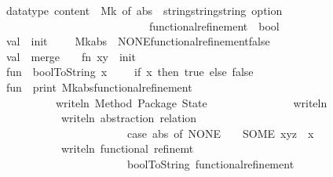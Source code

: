 \begin{isabellebody}
\isanewline
\ \ \ \ \ datatype\ content\ {\isacharequal}\ Mk\ of\ {\isacharbraceleft}abs\ {\isacharcolon}\ {\isacharparenleft}string{\isacharasterisk}string{\isacharasterisk}string{\isacharparenright}\ option{\isacharcomma}\isanewline
\ \ \ \ \ \ \ \ \ \ \ \ \ \ \ \ \ \ \ \ \ \ \ \ \ \ \ \ \ \ \ functional{\isacharunderscore}refinement\ {\isacharcolon}\ bool{\isacharbraceright}\ \isanewline
\isanewline
\ \ \ \ \ val\ \ init\ \ \ \ {\isacharequal}\ Mk{\isacharbraceleft}abs\ {\isacharequal}\ NONE{\isacharcomma}functional{\isacharunderscore}refinement{\isacharequal}false{\isacharbraceright}\isanewline
\ \ \ \ \ val\ \ merge\ \ \ {\isacharequal}\ fn\ {\isacharparenleft}x{\isacharcomma}y{\isacharparenright}\ {\isacharequal}{\isachargreater}\ init\isanewline
\ \ \ \ \ fun\ \ boolToString\ x\ \ \ \ {\isacharequal}\ if\ x\ then\ {\isachardoublequote}true{\isachardoublequote}\ else\ {\isachardoublequote}false{\isachardoublequote}\isanewline
\ \ \ \ \ fun\ \ print\ {\isacharparenleft}Mk{\isacharbraceleft}abs{\isacharcomma}functional{\isacharunderscore}refinement{\isacharbraceright}{\isacharparenright}\ {\isacharequal}\ \isanewline
\ \ \ \ \ \ \ \ \ \ \ \ \ \ {\isacharparenleft}writeln\ {\isacharparenleft}{\isachardoublequote}Method\ Package\ State{\isacharcolon}{\isachardoublequote}{\isacharparenright}{\isacharsemicolon}\isanewline
\ \ \ \ \ \ \ \ \ \ \ \ \ \ \ writeln\ {\isacharparenleft}{\isachardoublequote}{\isacharequal}{\isacharequal}{\isacharequal}{\isacharequal}{\isacharequal}{\isacharequal}{\isacharequal}{\isacharequal}{\isacharequal}{\isacharequal}{\isacharequal}{\isacharequal}{\isacharequal}{\isacharequal}{\isacharequal}{\isacharequal}{\isacharequal}{\isacharequal}{\isacharequal}{\isacharequal}{\isacharequal}{\isachardoublequote}{\isacharparenright}{\isacharsemicolon}\isanewline
\ \ \ \ \ \ \ \ \ \ \ \ \ \ \ writeln\ {\isacharparenleft}{\isachardoublequote}abstraction\ relation{\isacharcolon}\ {\isachardoublequote}{\isacharcircum}\isanewline
\ \ \ \ \ \ \ \ \ \ \ \ \ \ \ \ \ \ \ \ \ \ \ \ \ \ \ {\isacharparenleft}case\ abs\ of\ NONE\ {\isacharequal}{\isachargreater}\ {\isachardoublequote}{\isacharminus}{\isacharminus}{\isacharminus}{\isachardoublequote}\ {\isacharbar}\ SOME\ {\isacharparenleft}x{\isacharcomma}y{\isacharcomma}z{\isacharparenright}\ {\isacharequal}{\isachargreater}\ x{\isacharparenright}{\isacharparenright}{\isacharsemicolon}\ \isanewline
\ \ \ \ \ \ \ \ \ \ \ \ \ \ \ writeln\ {\isacharparenleft}{\isachardoublequote}functional\ refinemt\ {\isacharcolon}\ {\isachardoublequote}{\isacharcircum}\isanewline
\ \ \ \ \ \ \ \ \ \ \ \ \ \ \ \ \ \ \ \ \ \ \ \ \ \ \ {\isacharparenleft}boolToString\ functional{\isacharunderscore}refinement{\isacharparenright}{\isacharparenright}{\isacharparenright}\ \isanewline

\end{isabellebody}
